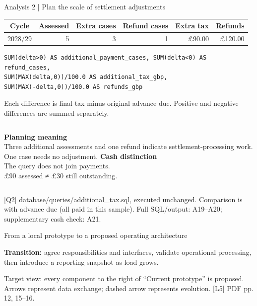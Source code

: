 \documentclass[10pt,aspectratio=169]{beamer}
\newcommand{\sources}[1]{\par\vfill{\fontsize{6.5}{7.8}\selectfont\color{muted}#1\par}}
\begin{document}
\begin{frame}[fragile]{Analysis 2 | Plan the scale of settlement adjustments}
\begin{center}
\begin{tabular}{@{}crrrrr@{}}\toprule
Cycle & Assessed & Extra cases & Refund cases & Extra tax & Refunds\\\midrule
2028/29 & 5 & 3 & 1 & £90.00 & £120.00\\\bottomrule
\end{tabular}
\end{center}
\begin{lstlisting}
SUM(delta>0) AS additional_payment_cases, SUM(delta<0) AS refund_cases,
SUM(MAX(delta,0))/100.0 AS additional_tax_gbp,
SUM(MAX(-delta,0))/100.0 AS refunds_gbp
\end{lstlisting}
{\small Each difference is final tax minus original advance due. Positive and negative differences are summed separately.}
\medskip
\begin{columns}[T,onlytextwidth]
\textbf{Planning meaning}\\Three additional assessments and one refund indicate settlement-processing work. One case needs no adjustment.
\textbf{Cash distinction}\\The query does not join payments.\\\alert{£90 assessed ≠ £30 still outstanding.}
\end{columns}
\sources{[Q2] database/queries/additional\_tax.sql, executed unchanged. Comparison is with advance due (all paid in this sample). Full SQL/output: A19–A20; supplementary cash check: A21.}
\end{frame}

\begin{frame}{From a local prototype to a proposed operating architecture}
\begin{center}\end{center}
\textbf{Transition:} agree responsibilities and interfaces, validate operational processing, then introduce a reporting snapshot as load grows.
\sources{Target view: every component to the right of “Current prototype” is proposed. Arrows represent data exchange; dashed arrow represents evolution. [L5] PDF pp. 12, 15–16.}
\end{frame}
\end{document}
